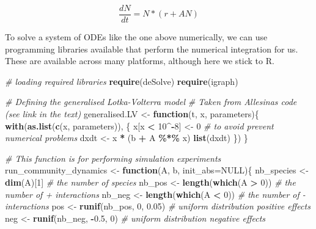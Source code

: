 \documentclass[
]{article}
\newenvironment{Shaded}{\begin{snugshade}}{\end{snugshade}}
\newcommand{\AttributeTok}[1]{\textcolor[rgb]{0.13,0.29,0.53}{#1}}
\newcommand{\CommentTok}[1]{\textcolor[rgb]{0.56,0.35,0.01}{\textit{#1}}}
\newcommand{\ConstantTok}[1]{\textcolor[rgb]{0.56,0.35,0.01}{#1}}
\newcommand{\ControlFlowTok}[1]{\textcolor[rgb]{0.13,0.29,0.53}{\textbf{#1}}}
\newcommand{\DecValTok}[1]{\textcolor[rgb]{0.00,0.00,0.81}{#1}}
\newcommand{\FloatTok}[1]{\textcolor[rgb]{0.00,0.00,0.81}{#1}}
\newcommand{\FunctionTok}[1]{\textcolor[rgb]{0.13,0.29,0.53}{\textbf{#1}}}
\newcommand{\NormalTok}[1]{#1}
\newcommand{\OtherTok}[1]{\textcolor[rgb]{0.56,0.35,0.01}{#1}}
\newcommand{\SpecialCharTok}[1]{\textcolor[rgb]{0.81,0.36,0.00}{\textbf{#1}}}
\begin{document}
\[
\frac{dN}{dt} = N * (r+AN)
\]

To solve a system of ODEs like the one above numerically, we can use
programming libraries available that perform the numerical integration
for us. These are available across many platforms, although here we
stick to R.

\begin{Shaded}
\begin{Highlighting}[]
\CommentTok{\# loading required libraries}
\FunctionTok{require}\NormalTok{(deSolve)}
\FunctionTok{require}\NormalTok{(igraph)}

\CommentTok{\# Defining the generalised Lotka{-}Volterra model}
\CommentTok{\# Taken from Allesina\textquotesingle{}s code (see link in the text)}
\NormalTok{generalised.LV }\OtherTok{\textless{}{-}} \ControlFlowTok{function}\NormalTok{(t, x, parameters)\{}
  \FunctionTok{with}\NormalTok{(}\FunctionTok{as.list}\NormalTok{(}\FunctionTok{c}\NormalTok{(x, parameters)), \{}
\NormalTok{    x[x }\SpecialCharTok{\textless{}} \DecValTok{10}\SpecialCharTok{\^{}{-}}\DecValTok{8}\NormalTok{] }\OtherTok{\textless{}{-}} \DecValTok{0} \CommentTok{\# to avoid prevent numerical problems}
\NormalTok{    dxdt }\OtherTok{\textless{}{-}}\NormalTok{ x }\SpecialCharTok{*}\NormalTok{ (b }\SpecialCharTok{+}\NormalTok{ A }\SpecialCharTok{\%*\%}\NormalTok{ x)}
    \FunctionTok{list}\NormalTok{(dxdt)}
\NormalTok{  \})}
\NormalTok{\}}

\CommentTok{\# This function is for performing simulation experiments}
\NormalTok{run\_community\_dynamics }\OtherTok{\textless{}{-}} \ControlFlowTok{function}\NormalTok{(A, b, }\AttributeTok{init\_abs=}\ConstantTok{NULL}\NormalTok{)\{}
\NormalTok{  nb\_species }\OtherTok{\textless{}{-}} \FunctionTok{dim}\NormalTok{(A)[}\DecValTok{1}\NormalTok{]           }\CommentTok{\# the number of species}
\NormalTok{  nb\_pos }\OtherTok{\textless{}{-}} \FunctionTok{length}\NormalTok{(}\FunctionTok{which}\NormalTok{(A }\SpecialCharTok{\textgreater{}} \DecValTok{0}\NormalTok{))        }\CommentTok{\# the number of + interactions}
\NormalTok{  nb\_neg }\OtherTok{\textless{}{-}} \FunctionTok{length}\NormalTok{(}\FunctionTok{which}\NormalTok{(A }\SpecialCharTok{\textless{}} \DecValTok{0}\NormalTok{))        }\CommentTok{\# the number of {-} interactions}
\NormalTok{  pos }\OtherTok{\textless{}{-}} \FunctionTok{runif}\NormalTok{(nb\_pos, }\DecValTok{0}\NormalTok{, }\FloatTok{0.05}\NormalTok{) }\CommentTok{\# uniform distribution positive effects}
\NormalTok{  neg }\OtherTok{\textless{}{-}} \FunctionTok{runif}\NormalTok{(nb\_neg, }\SpecialCharTok{{-}}\FloatTok{0.5}\NormalTok{, }\DecValTok{0}\NormalTok{) }\CommentTok{\# uniform distribution negative effects}
  

\end{Highlighting}
\end{Shaded}
\end{document}
